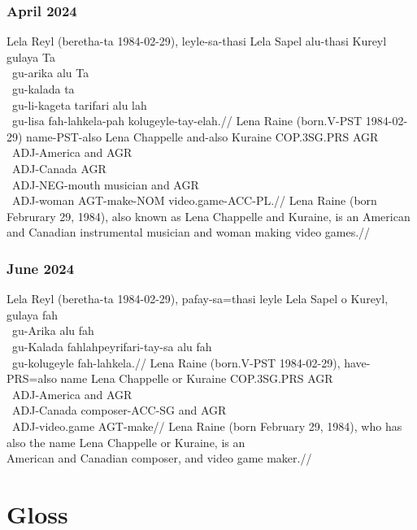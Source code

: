\subsubsection*{April 2024}

\ex
\begingl
\gla Lela Reyl   (beretha-ta 1984-02-29),   leyle-sa-thasi Lela Sapel      alu-thasi Kureyl gulaya       Ta\\~{}{}gu-arika     alu Ta\\~{}{}gu-kalada   ta\\~{}{}gu-li-kageta   tarifari alu lah\\~{}{}gu-lisa   fah-lahkela-pah kolugeyle-tay-elah.//
\glb Lena Raine  (born.V-PST 1984-02-29)    name-PST-also  Lena Chappelle  and-also  Kuraine COP.3SG.PRS AGR\\~{}{}ADJ-America and AGR\\~{}{}ADJ-Canada AGR\\~{}{}ADJ-NEG-mouth musician and AGR\\~{}{}ADJ-woman AGT-make-NOM    video.game-ACC-PL.//
\glft Lena Raine  (born Februrary 29, 1984), also known as Lena Chappelle and Kuraine, is an American and Canadian instrumental musician and woman making video games.//
\endgl
\xe

\newpage

\subsubsection*{June 2024}

\ex
\begingl
\gla Lela Reyl  (beretha-ta 1984-02-29), pafay-sa=thasi leyle Lela Sapel     o  Kureyl, gulaya      fah\\~{}{}gu-Arika    alu fah\\~{}{}gu-Kalada  fahlahpeyrifari-tay-sa alu fah\\~{}{}gu-kolugeyle   fah-lahkela.//
\glb Lena Raine (born.V-PST 1984-02-29), have-PRS=also  name  Lena Chappelle or Kuraine COP.3SG.PRS AGR\\~{}{}ADJ-America and AGR\\~{}{}ADJ-Canada composer-ACC-SG        and AGR\\~{}{}ADJ-video.game AGT-make//
\glft Lena Raine (born February 29, 1984), who has also the name Lena Chappelle or Kuraine, is an \\American and Canadian composer, and video game maker.//
\endgl
\xe

\section{Gloss}


